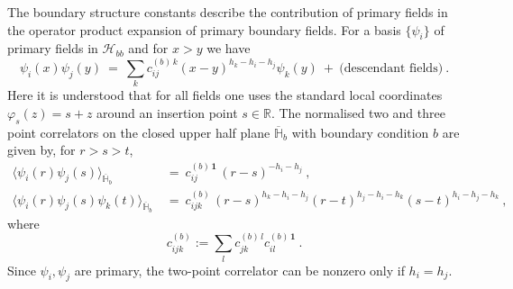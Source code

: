 \documentclass[11pt,a4paper]{article}
\numberwithin{equation}{section}
\newcommand{\one}{\mathbf{1}} %
\begin{document}
The boundary structure constants describe the contribution of primary fields in the operator product expansion of primary boundary fields. For a basis $\{ \psi_i \}$ of primary fields in $\mathcal{H}_{bb}$ and for $x>y$ we have
\begin{equation}
    \psi_i(x) \psi_j(y) ~=~ \sum_{k} c_{ij}^{(b)\,k} (x-y)^{h_k-h_i-h_j} \psi_k(y) ~+~ \text{(descendant fields)} ~.
\end{equation}
Here it is understood that for all fields one uses the standard local coordinates $\varphi_s(z) = s+z$ around an insertion point $s \in \mathbb{R}$. The normalised two and three point correlators on the closed upper half plane $\overline{\mathbb{H}}_b$ with boundary condition $b$ are given by, for $r>s>t$,
\begin{align}
    \big\langle \psi_i(r) \psi_j(s) \big\rangle_{\overline{\mathbb{H}}_b} &~=~ c^{(b) \, \one}_{ij}
    \, (r-s)^{-h_i-h_j}  ~,
    \nonumber \\
    \big\langle \psi_i(r) \psi_j(s) \psi_k(t) \big\rangle_{\overline{\mathbb{H}}_b} &~=~ c^{(b)}_{ijk} \,
    (r-s)^{h_k-h_i-h_j} 
    (r-t)^{h_j-h_i-h_k} 
    (s-t)^{h_i-h_j-h_k} ~,
\label{eq:UHP-2pt3pt}
\end{align}
where
\begin{equation}
    c^{(b)}_{ijk} := \sum_l c^{(b) \, l}_{jk} c^{(b) \, \one}_{il}  ~.
\end{equation}
Since $\psi_i,\psi_j$ are primary, the two-point correlator can be nonzero only if $h_i=h_j$.
\end{document}
